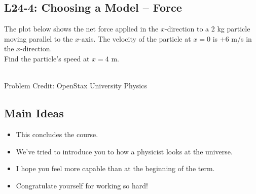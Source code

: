 \documentclass[]{article}
\newcommand{\Week}{24}
\begin{document}
\begin{PresentSpace}
\vspace{-10pt}
\section*{L\Week-4: Choosing a Model -- Force}
\vspace{-5pt}
The plot below shows the net force applied in the $x$-direction to a 2 kg particle moving parallel to the $x$-axis. The velocity of the particle at $x=0$ is $+6$ m/s in the $x$-direction. \\

\noindent Find the particle's speed at $x=4$ m.
\begin{center}
	 \\
	\small
	Problem Credit: OpenStax University Physics
\end{center}
\end{PresentSpace}
\newpage
\begin{TeacherMargin}
	
\end{TeacherMargin}
\begin{PresentSpace}
\section*{Main Ideas}
\begin{itemize}
	\item This concludes the course.
	\item We've tried to introduce you to how a physicist looks at the universe.
	\item I hope you feel more capable than at the beginning of the term.
	\item Congratulate yourself for working so hard!
\end{itemize}
\end{PresentSpace}
\end{document}
